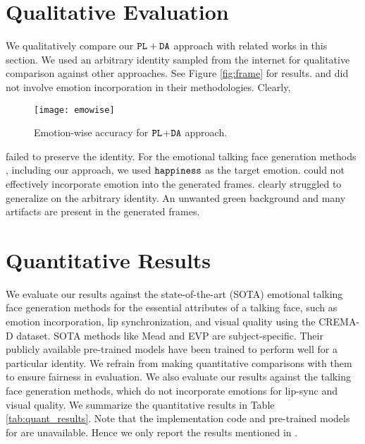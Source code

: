 \documentclass[accepted]{uai2023}
\begin{document}
\section{Qualitative Evaluation}
\label{section:qr}
We qualitatively compare our {${\tt PL+DA}$} approach with related works in this section.
We used an arbitrary identity sampled from the internet for qualitative comparison against other approaches. See Figure \ref{fig:frame} for results.
\cite{wang2021audio2head} and \cite{prajwal2020lip} did not involve emotion incorporation in their methodologies. Clearly, 
\begin{figure}[htp]
    \centering
    \texttt{[image: emowise]}
    \caption{Emotion-wise accuracy for ${\tt PL}$+${\tt DA}$ approach.}
    \label{fig:emowise}
\end{figure} 
\citet{wang2021audio2head} failed to preserve the identity. For the emotional talking face generation methods \citep{9496264,magnusson2021invertable}, including our approach, we used {${\tt happiness}$} as the target emotion. \citet{9496264} could not effectively incorporate emotion into the generated frames. 
\citet{magnusson2021invertable} 
clearly struggled to generalize on the arbitrary identity. An unwanted green background and many artifacts are present in the generated frames.













\section{Quantitative Results}
We evaluate our results against the state-of-the-art (SOTA) emotional talking face generation methods \citep{DBLP:journals/corr/abs-1906-06337,9496264, sinha2022emotion} for the essential attributes of a talking face, such as emotion incorporation, lip synchronization, and visual quality using the CREMA-D \citep{cao2014crema} dataset.
SOTA methods like Mead \citep{wang2020mead} and EVP \citep{Ji_2021_CVPR} are subject-specific. Their publicly available pre-trained models have been trained to perform well for a particular identity. We refrain from making quantitative comparisons with them to ensure fairness in evaluation. We also evaluate our results against the talking face generation methods, which do not incorporate emotions \citep{prajwal2020lip, wang2021audio2head} for lip-sync and visual quality. We summarize the quantitative results in Table \ref{tab:quant_results}. Note that the implementation code and pre-trained models for \citep{DBLP:journals/corr/abs-1906-06337, sinha2022emotion} are unavailable. Hence we only report the results mentioned in \citep{sinha2022emotion}. 
\end{document}
